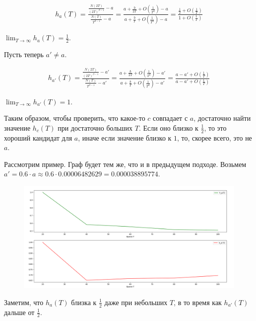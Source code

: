 \documentclass{article}
\begin{document}
\begin{gather*}
    h_{a}(T) = \frac{\frac{N(2T)}{(2T)^{\beta - 1}} - a}{\frac{N(T)}{T^{\beta - 1}} - a} = \frac{a + \frac{b}{2T} + O\left(\frac{1}{T^{2}}\right) - a}{a + \frac{b}{T} + O\left(\frac{1}{T^{2}}\right) - a} = \frac{\frac{1}{2} + O\left(\frac{1}{T}\right)}{1 + O\left(\frac{1}{T}\right)}
\end{gather*}

$\lim_{T \to \infty}{h_{a}(T)} = \frac{1}{2}$.

Пусть теперь $a' \neq a$.

\begin{gather*}
    h_{a'}(T) = \frac{\frac{N(2T)}{(2T)^{\beta - 1}} - a'}{\frac{N(T)}{T^{\beta - 1}} - a'} = \frac{a + \frac{b}{2T} + O\left(\frac{1}{T^{2}}\right) - a'}{a + \frac{b}{T} + O\left(\frac{1}{T^{2}}\right) - a'} = \frac{a - a' + O\left(\frac{1}{T}\right)}{a - a' + O\left(\frac{1}{T}\right)}
\end{gather*}

$\lim_{T \to \infty}{h_{a'}(T)} = 1$.

Таким образом, чтобы проверить, что какое-то $c$ совпадает с $a$, достаточно найти значение $h_{c}(T)$ при достаточно больших $T$. Если оно близко к $\frac{1}{2}$, то это хороший кандидат для $a$, иначе если значение близко к $1$, то, скорее всего, это не $a$.

Рассмотрим пример. Граф будет тем же, что и в предыдущем подходе. Возьмем $a' = 0.6 \cdot a \approx 0.6 \cdot 0.00006482629 = 0.000038895774$.

\begin{figure}[!htb]
\begin{center}
\includegraphics[scale=0.5]{Experiment_2.png}
\end{center}
\end{figure}

\FloatBarrier

Заметим, что $h_{a}(T)$ близка к $\frac{1}{2}$ даже при небольших $T$, в то время как $h_{a'}(T)$ дальше от $\frac{1}{2}$.
\end{document}
